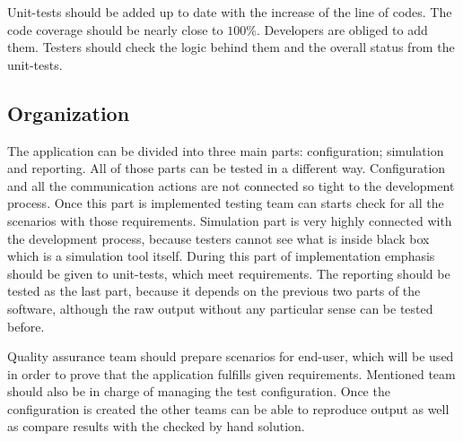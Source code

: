 	Unit-tests should be added up to date with the increase of the line of codes. The code coverage should be nearly close to $100\%$. Developers are obliged to add them. Testers should check the logic behind them and the overall status from the unit-tests.
\subsection{Organization} \label{s:introduction:organization}
	\begin{comment}
		$<$Describe the relationship of the test processes to other processes such as development, project
		management, quality assurance, and configuration management. Include the lines of communication
		within the testing organization(s), the authority for resolving issues raised by the testing tasks, and the authority for approving test products and processes. This may include (but should not be limited to) a visual representation, e.g., an organization chart. $>$
	\end{comment}
	The application can be divided into three main parts: configuration; simulation and reporting. All of those parts can be tested in a different way. Configuration and all the communication actions are not connected so tight to the development process. Once this part is implemented testing team can starts check for all the scenarios with those requirements. Simulation part is very highly connected with the development process, because testers cannot see what is inside black box which is a simulation tool itself. During this part of implementation emphasis should be given to unit-tests, which meet requirements. The reporting should be tested as the last part, because it depends on the previous two parts of the software, although the raw output without any particular sense can be tested before.
	
	Quality assurance team should prepare scenarios for end-user, which will be used in order to prove that the application fulfills given requirements. Mentioned team should also be in charge of managing the test configuration. Once the configuration is created the other teams can be able to reproduce output as well as compare results with the checked by hand solution.
